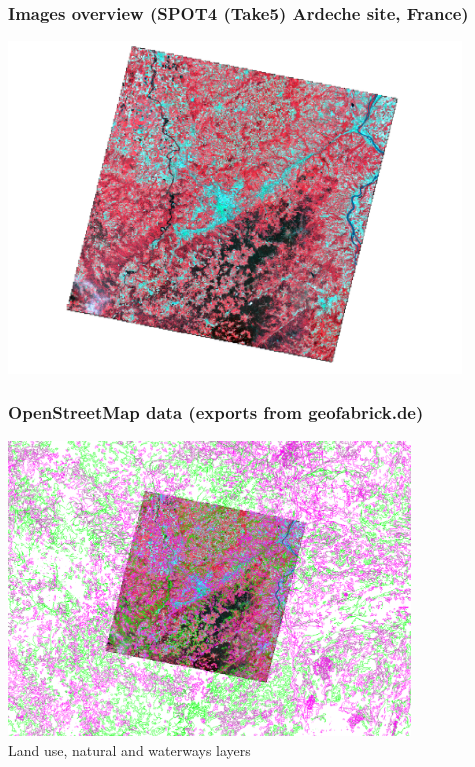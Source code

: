 \documentclass[8pt]{beamer}
\begin{document}
\begin{frame}
\frametitle{Images overview (SPOT4 (Take5) Ardeche site, France)}
\begin{center}
\includegraphics[width=0.9\textwidth]{images/spot4t5.png}
\end{center}
\end{frame}

\begin{frame}
\frametitle{OpenStreetMap data (exports from geofabrick.de)}
\begin{center}
\includegraphics[width=0.8\textwidth]{images/osm.png}\\
Land use, natural and waterways layers
\end{center}
\end{frame}
\end{document}
